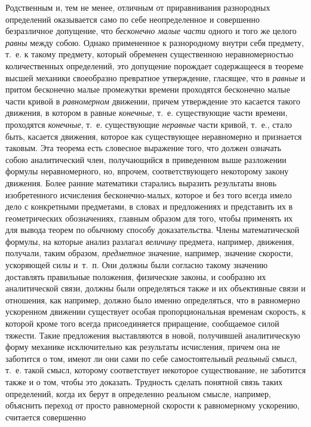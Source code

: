 Родственным и, тем не менее, отличным от приравнивания разнородных
определений оказывается само по себе неопределенное и совершенно
безразличное допущение, что {\em бесконечно малые
части} одного и того же целого {\em равны} между собою.
Однако примененное к разнородному внутри себя предмету, т.~е. к такому
предмету, который обременен существенною неравномерностью количественных
определений, это допущение порождает содержащееся в теореме высшей механики
своеобразно превратное утверждение, гласящее, что в
{\em равные} и притом бесконечно малые промежутки
времени проходятся бесконечно малые части кривой в
{\em равномерном} движении, причем утверждение это
касается такого движения, в котором в равные
{\em конечные}, т.~е. существующие части времени,
проходятся {\em конечные}, т.~е. существующие
{\em неравные} части кривой, т.~е., стало быть,
касается движения, которое как существующее неравномерно и признается
таковым. Эта теорема есть словесное выражение того, что должен означать
собою аналитический член, получающийся в приведенном выше разложении
формулы неравномерного, но, впрочем, соответствующего некоторому закону
движения. Более ранние математики старались выразить результаты вновь
изобретенного исчисления бесконечно-малых, которое и без того всегда имело
дело с конкретными предметами, в словах и предложениях и представить их в
геометрических обозначениях, главным образом для того, чтобы применять их
для вывода теорем по обычному способу доказательства. Члены математической
формулы, на которые анализ разлагал {\em величину}
предмета, например, движения, получали, таким образом,
{\em предметное} значение, например, значение скорости,
ускоряющей силы и~т.~п. Они должны были согласно такому значению доставлять
правильные положения, физические законы, и сообразно их аналитической
связи, должны были определяться также и их объективные связи и отношения,
как например, должно было именно определяться, что в равномерно ускоренном
движении существует особая пропорциональная временам скорость, к которой
кроме того всегда присоединяется приращение, сообщаемое силой тяжести.
Такие предложения выставляются в новой, получившей аналитическую форму
механике исключительно как результаты исчисления, причем она не заботится о
том, имеют ли они сами по себе самостоятельный
{\em реальный} смысл, т.~е. такой смысл, которому
соответствует некоторое существование, не заботится также и о том, чтобы
это доказать. Трудность сделать понятной связь таких определений, когда их
берут в определенно реальном смысле, например, объяснить переход от просто
равномерной скорости к равномерному ускорению, считается совершенно

